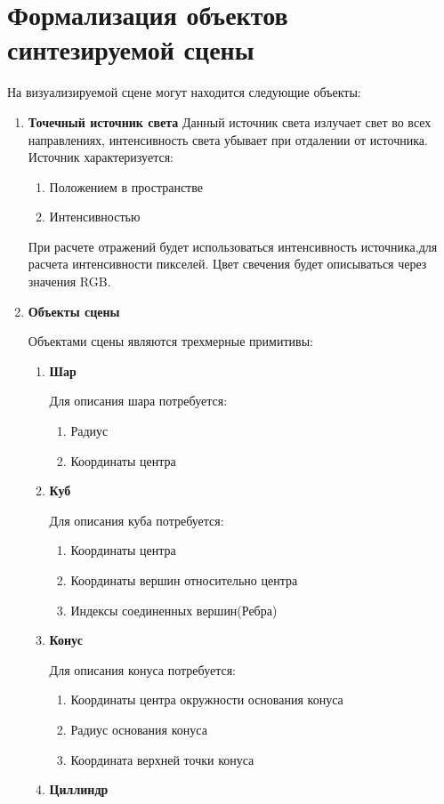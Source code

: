 \documentclass[a4paper,14pt, unknownkeysallowed]{extreport}
\begin{document}
\section[Формализация объектов синтезируемой сцены]{Формализация объектов синтезируемой сцены}
На визуализируемой сцене могут находится следующие объекты:
\begin{enumerate}
	\item \textbf{Точечный источник света}
	Данный источник света излучает свет во всех направлениях, интенсивность света убывает при отдалении от источника.
	Источник характеризуется:
	\begin{enumerate}
		\item Положением в пространстве
		\item Интенсивностью
	\end{enumerate}
	При расчете отражений будет использоваться интенсивность источника,для расчета интенсивности пикселей. Цвет свечения будет описываться через значения RGB.
	\item \textbf{Объекты сцены}
	
	Объектами сцены являются трехмерные примитивы:
	\begin{enumerate}
		\item \textbf{Шар}
		
		Для описания шара потребуется:
		\begin{enumerate}
			\item Радиус
			\item Координаты центра
		\end{enumerate}
		\item  \textbf{Куб}
		
		Для описания куба потребуется:
		\begin{enumerate}
			\item Координаты центра
			\item Координаты вершин относительно центра
			\item Индексы соединенных вершин(Ребра)
		\end{enumerate}
		\item  \textbf{Конус}
		
		Для описания конуса потребуется:
		\begin{enumerate}
			\item Координаты центра окружности основания конуса
			\item Радиус основания конуса
			\item Координата верхней точки конуса
		\end{enumerate}
		\item  \textbf{Циллиндр}
		

\end{enumerate}
\end{enumerate}
\end{document}

